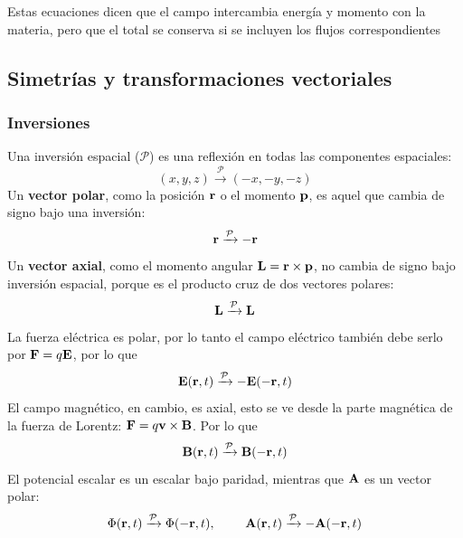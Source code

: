 \documentclass[]{article}
\numberwithin{equation}{section}
\begin{document}
Estas ecuaciones dicen que el campo intercambia energía y momento con la materia, pero que el total se conserva si se incluyen los flujos correspondientes

\subsection{Simetrías y transformaciones vectoriales}

\subsubsection{Inversiones}
Una inversión espacial (\(\mathcal{P}\)) es  una reflexión en todas las componentes espaciales:
\begin{equation*}
	(x,y,z) \xrightarrow{\mathcal{P}} (-x,-y,-z)
\end{equation*}
Un \textbf{vector polar}, como la posición \(\mathbf{r}\) o el momento \(\mathbf{p}\), es aquel que cambia de signo bajo una inversión:
\begin{equation*}
	\mathbf{r} \xrightarrow{\mathcal{P}} -\mathbf{r}
\end{equation*}
Un \textbf{vector axial}, como el momento angular \(\mathbf{L} = \mathbf{r}\times\mathbf{p}\), no cambia de signo bajo inversión espacial, porque es el producto cruz de dos vectores polares:
\begin{equation*}
	\mathbf{L} \xrightarrow{\mathcal{P}} \mathbf{L}
\end{equation*}
La fuerza eléctrica es polar, por lo tanto el campo eléctrico también debe serlo por \(\mathbf{F} = q \mathbf{E}\), por lo que
\begin{equation}
	\mathbf{E}(\mathbf{r},t) \xrightarrow{\mathcal{P}} -\mathbf{E}(-\mathbf{r},t)
\end{equation}
El campo magnético, en cambio, es axial, esto se ve desde la parte magnética de la fuerza de Lorentz: \(\mathbf{F} = q \mathbf{v}\times\mathbf{B}\). Por lo que
\begin{equation}
	\mathbf{B}(\mathbf{r},t) \xrightarrow{\mathcal{P}} \mathbf{B}(-\mathbf{r},t)
\end{equation}
El potencial escalar es un escalar bajo paridad, mientras que \(\mathbf{A}\) es un vector polar:
\begin{equation}
	\Phi(\mathbf{r},t) \xrightarrow{\mathcal{P}} \Phi(-\mathbf{r},t), ~~~~~~~ \mathbf{A}(\mathbf{r},t) \xrightarrow{\mathcal{P}} -\mathbf{A}(-\mathbf{r},t)
\end{equation}
\end{document}
